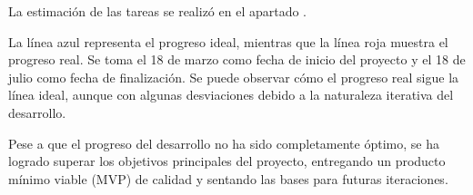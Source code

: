 La estimación de las tareas se realizó en el apartado .

\newpage{}
La línea azul representa el progreso ideal, mientras que la línea roja muestra
el progreso real. Se toma el 18 de marzo como fecha de inicio del proyecto y el
18 de julio como fecha de finalización. Se puede observar cómo el progreso real
sigue la línea ideal, aunque con algunas desviaciones debido a la naturaleza
iterativa del desarrollo.

Pese a que el progreso del desarrollo no ha sido completamente óptimo, se ha
logrado superar los objetivos principales del proyecto, entregando un producto
mínimo viable (MVP) de calidad y sentando las bases para futuras iteraciones.

\newpage{}


\newpage{}


\newpage{}


\newpage{}

